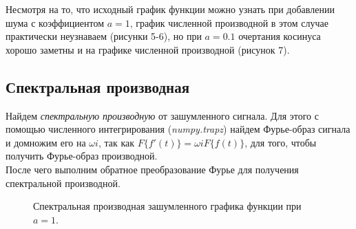 \documentclass[a5paper, 10pt]{article}
\theoremstyle{definition}
\theoremstyle{plain}
\theoremstyle{remark}
\begin{document}
Несмотря на то, что исходный график функции можно узнать при добавлении шума с коэффициентом $a=1$, график численной производной в этом случае практически неузнаваем (рисунки 5-6), но при $a=0.1$ очертания косинуса хорошо заметны и на графике численной производной (рисунок 7).


\newpage
\subsection{Спектральная производная}

Найдем \textit{спектральную производную} от зашумленного сигнала. Для этого с помощью численного интегрирования (\textit{numpy.trapz}) найдем Фурье-образ сигнала и домножим его на $\omega i$, так как $F\{ f'(t)\} = \omega i F\{ f(t)\}$, для того, чтобы получить Фурье-образ производной. \\
После чего выполним обратное преобразование Фурье для получения спектральной производной.

\begin{figure}[h!]
\caption{Спектральная производная зашумленного графика функции при $a=1$.}
\end{figure}
\end{document}
